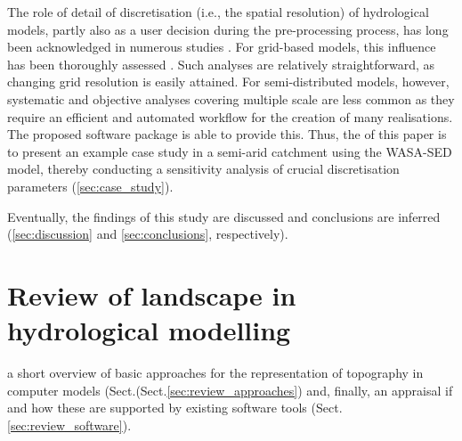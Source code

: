 The role of detail of discretisation (i.e., the spatial resolution) of hydrological models, partly also as a user decision during the pre-processing process, has long been acknowledged in numerous studies \citep[e.g.,][]{Wood1988,Kumar2010,Han2014a,Euser2015,Haghnegahdar2015,Gonzales2016}.
For grid-based models, this influence has been thoroughly assessed \citep[e.g.,][]{Zhang1994,Refsgaard1997b,Molnar2000,Sulis2011}.
Such analyses are relatively straightforward, as changing grid resolution is easily attained.
For semi-distributed models, however, systematic and objective analyses covering multiple scale are less common as they require an efficient and automated workflow for the creation of many realisations.
The proposed software package is able to provide this.
Thus, the \DIFdelbegin {}\DIFdelend \DIFaddbegin \emph{} \DIFaddend of this paper is to present an example case study in a semi-arid catchment using the WASA-SED model, thereby conducting a sensitivity analysis of crucial discretisation parameters (\DIFdelbegin {}\DIFdelend \DIFaddbegin {}\DIFaddend \ref{sec:case_study}).

Eventually, the findings of this study are discussed and conclusions are inferred (\DIFdelbegin {}\DIFdelend \DIFaddbegin {}\DIFaddend \ref{sec:discussion} and \ref{sec:conclusions}, respectively).




\section{Review of landscape \DIFdelbegin {}\DIFdelend \DIFaddbegin {}\DIFaddend in hydrological modelling}
\label{sec:review}
\DIFdelbegin {}\DIFdelend \DIFaddbegin {}\DIFaddend a short overview of basic approaches for the representation of topography in computer models (Sect.\DIFdelbegin {}\DIFdelend \DIFaddbegin {}\DIFaddend (Sect.\DIFaddbegin \DIFadd{\ }\DIFaddend \ref{sec:review_approaches}) and, finally, an appraisal if and how these are supported by existing software tools (Sect.\DIFaddbegin \DIFadd{\ }\DIFaddend \ref{sec:review_software}).

